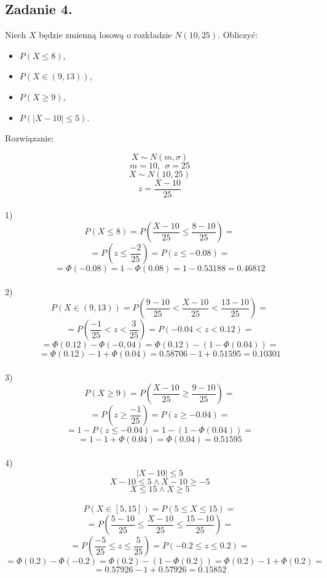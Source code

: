 \subsection{Zadanie 4.}
Niech $X$ będzie zmienną losową o rozkładzie $N (10, 25)$. Obliczyć:
\begin{itemize}
\item $P (X \leq 8)$,
\item $P (X \in (9, 13))$, 
\item $P (X \geq 9)$, 
\item $P ( | X - 10 | \leq 5)$.
\end{itemize}

Rozwiązanie:

$$ X \sim N ( m, \sigma )$$
$$ m = 10, \ \ \sigma = 25 $$
$$ X \sim N ( 10, 25 )$$
$$ z = \frac{X - 10}{25} $$  \\

1)
$$ P( X \le 8 ) = P( \frac{X - 10}{25} \le \frac{8 - 10}{25} ) = $$ 
$$ = P( z \le \frac{-2}{25} ) = P( z \le -0.08 ) =  $$
$$ = \Phi(-0.08) = 1 - \Phi(0.08) = 1 - 0.53188 = 0.46812 $$ \\

2)
$$  P( X \in (9, 13) ) = P( \frac{9 - 10}{25} < \frac{X - 10}{25} < \frac{13 - 10}{25} ) = $$
$$ = P(  \frac{-1}{25} < z < \frac{3}{25}) = P( -0.04 < z < 0.12 ) = $$
$$ = \Phi(0.12) - \Phi(-0,04 )= \Phi(0.12) - ( 1 - \Phi(0.04) ) = $$
$$ =  \Phi(0.12) - 1 + \Phi(0.04) = 0.58706 - 1 + 0.51595 = 0.10301 $$ \\

3)
$$  P( X \ge 9 ) = P( \frac{X - 10}{25} \ge \frac{9 - 10}{25} ) =  $$
$$  = P( z \ge \frac{-1}{25} ) =   P( z \ge -0.04 ) = $$
$$ = 1 - P( z \le -0.04 ) = 1 - ( 1 - \Phi(0.04) ) = $$
$$ = 1 - 1 + \Phi(0.04) =\Phi(0.04) = 0.51595 $$ \\

4)
$$ | X - 10 | \le 5 $$
$$ X - 10 \le 5 \wedge X - 10 \ge -5 $$
$$ X \le 15 \wedge X \ge 5 $$ \\

$$ P( X \in [5, 15] ) =  P( 5 \le X \le 15 ) = $$
$$ = P( \frac{5 - 10}{25} \le \frac{X - 10}{25} \le \frac{15 - 10}{25} ) = $$
$$ = P( \frac{-5}{25} \le z \le \frac{5}{25} ) = P( -0.2 \le z \le 0.2 ) = $$
$$ = \Phi(0.2) - \Phi(-0.2) = \Phi(0.2) - (1 - \Phi(0.2) ) = \Phi(0.2) - 1 + \Phi(0.2) = $$
$$ = 0.57926 - 1 +  0.57926 = 0.15852 $$
